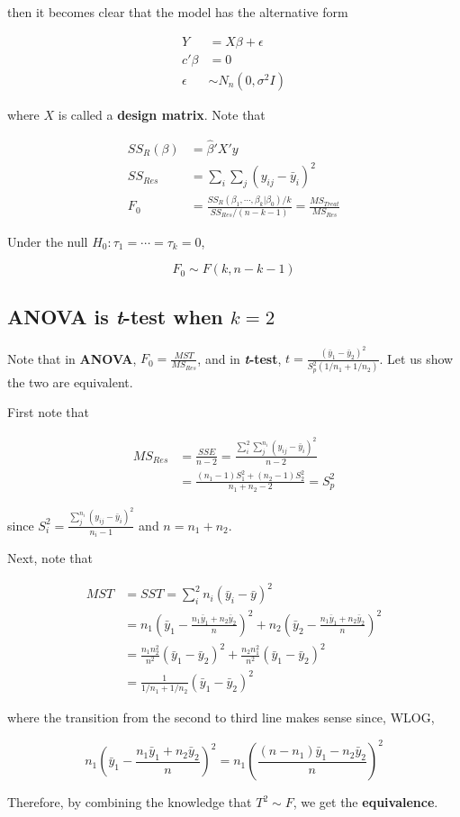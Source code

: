 \documentclass[12pt]{article}
\begin{document}
then it becomes clear that the model has the alternative form

$$
\begin{aligned}
Y &= X\beta + \epsilon\\[8pt]
c' \beta &= 0 \\[8pt]
\epsilon &\sim N_n (0, \sigma^2 I)
\end{aligned}
$$

where $X$ is called a \textbf{design matrix}. Note that 

$$
\begin{aligned}
SS_R (\beta) &= \hat{\beta}' X' y \\[8pt]
SS_{Res} &= \sum_i \sum_j (y_{ij} - \bar{y}_i)^2 \\[8pt]
F_0 &= \frac{SS_R(\beta_1, \cdots, \beta_k | \beta_0)/k}{SS_{Res}/(n-k-1)} = \frac{MS_{Treat}}{MS_{Res}}
\end{aligned}
$$


Under the null $H_0 : \tau_1 = \cdots = \tau_k = 0$, 

$$F_0 \sim F(k, n-k-1)$$


\subsection{ANOVA is \textit{t}-test when $k=2$}

Note that in \textbf{ANOVA}, $F_0 = \frac{MST}{MS_{Res}}$, and in \textbf{\textit{t}-test}, $t = \frac{(\bar{y}_1 - \bar{y}_2)^2} {S_p^2 (1/n_1 + 1/n_2)}$. Let us show the two are equivalent.

First note that 

$$
\begin{aligned}
MS_{Res} &= \frac{SSE}{n-2} = \frac{\sum_i^2 \sum_j^{n_i} (y_{ij} - \bar{y}_i)^2}{n-2} \\[8pt]
&= \frac{(n_1 - 1)S_1^2 + (n_2 - 1)S_2^2}{n_1 + n_2 - 2} = S_p^2
\end{aligned}
$$

since $S_i^2 = \frac{\sum_j^{n_i} (y_{ij} - \bar{y}_i)^2}{n_i - 1}$ and $n = n_1 + n_2$.

Next, note that 

$$
\begin{aligned}
MST &= SST = \sum_i^2 n_i (\bar{y}_i - \bar{y})^2 \\[8pt]
&= n_1 \left( \bar{y}_1 - \frac{n_1\bar{y}_1 + n_2 \bar{y}_2}{n} \right)^2 + n_2 \left( \bar{y}_2 - \frac{n_1\bar{y}_1 + n_2 \bar{y}_2}{n} \right)^2 \\[8pt]
&= \frac{n_1 n_2^2}{n^2} (\bar{y}_1 - \bar{y}_2)^2 + \frac{n_2 n_1^2}{n^2} (\bar{y}_1 - \bar{y}_2)^2 \\[8pt]
&= \frac{1}{1/n_1 + 1/n_2} (\bar{y}_1 - \bar{y}_2)^2
\end{aligned}
$$

where the transition from the second to third line makes sense since, WLOG,

$$
n_1 \left( \bar{y}_1 - \frac{n_1\bar{y}_1 + n_2 \bar{y}_2}{n} \right)^2 = n_1 \left( \frac{(n-n_1) \bar{y}_1 - n_2 \bar{y}_2}{n} \right)^2
$$


Therefore, by combining the knowledge that $T^2 \sim F$, we get the \textbf{equivalence}.
\end{document}
